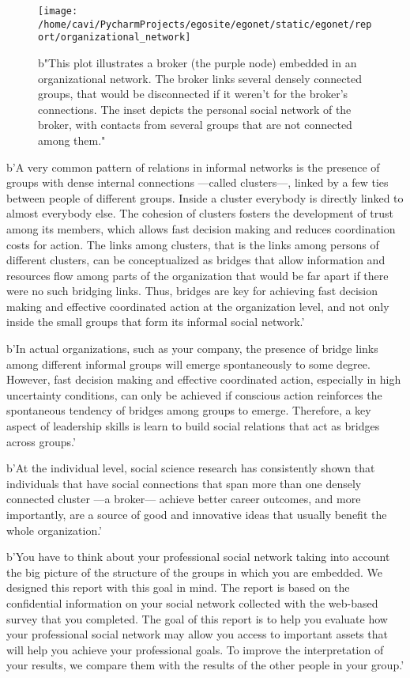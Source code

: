 \documentclass[a4paper,12pt]{article}
\begin{document}
\begin{figure}[H]
\centering
\texttt{[image: /home/cavi/PycharmProjects/egosite/egonet/static/egonet/report/organizational\_network]}
\caption{b"This plot illustrates a broker (the purple node) embedded in an organizational network. The broker links several densely connected groups, that would be disconnected if it weren't for the broker's connections. The inset depicts the personal social network of the broker, with contacts from several groups that are not connected among them."}
\end{figure}


b'A very common pattern of relations in informal networks is the presence of groups with dense internal connections ---called clusters---, linked by a few ties between people of different groups. Inside a cluster everybody is directly linked to almost everybody else. The cohesion of clusters fosters the development of trust among its members, which allows fast decision making and reduces coordination costs for action. The links among clusters, that is the links among persons of different clusters, can be conceptualized as bridges that allow information and resources flow among parts of the organization that would be far apart if there were no such bridging links. Thus, bridges are key for achieving fast decision making and effective coordinated action at the organization level, and not only inside the small groups that form its informal social network.'

b'In actual organizations, such as your company, the presence of bridge links among different informal groups will emerge spontaneously to some degree. However, fast decision making and effective coordinated action, especially in high uncertainty conditions, can only be achieved if conscious action reinforces the spontaneous tendency of bridges among groups to emerge. Therefore, a key aspect of leadership skills is learn to build social relations that act as bridges across groups.'

b'At the individual level, social science research has consistently shown that individuals that have social connections that span more than one densely connected cluster ---a broker--- achieve better career outcomes, and more importantly, are a source of good and innovative ideas that usually benefit the whole organization.'

b'You have to think about your professional social network taking into account the big picture of the structure of the groups in which you are embedded. We designed this report with this goal in mind. The report is based on the confidential information on your social network collected with the web-based survey that you completed. The goal of this report is to help you evaluate how your professional social network may allow you access to important assets that will help you achieve your professional goals. To improve the interpretation of your results, we compare them with the results of the other people in your group.'
\end{document}
